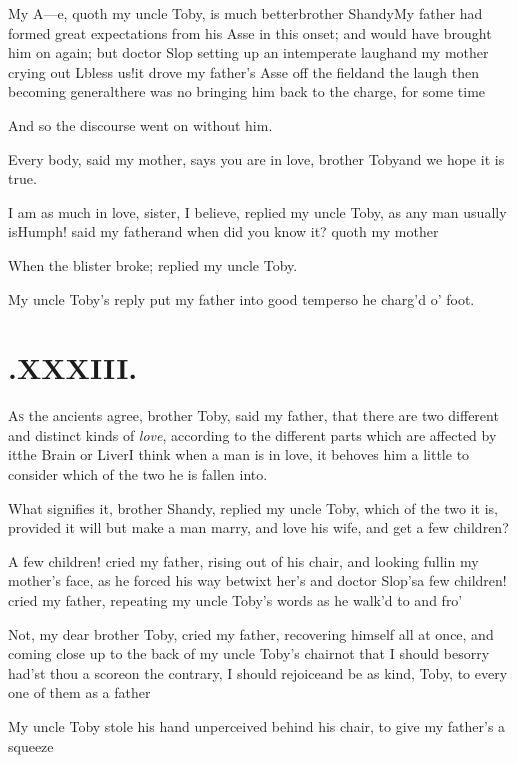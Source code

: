 \documentclass{article}
\begin{document}
My A—e, quoth my uncle Toby, is much
better\tsk brother Shandy\tsk My father had formed great
expectations from his Asse in this onset; and would have brought
him on again; but doctor Slop setting up an intemperate
laugh\tsk and my mother crying out L\tsk bless us!\tsk it
drove my father’s Asse off the field\tsk and the laugh then
becoming general\tsk there was no bringing him back to the
charge, for some time\tsh

\newpage
And so the discourse went on without him.

Every body, said my mother, says\break
you are in love, brother Toby\tsk and we\break
hope it is true.

I am as much in love, sister, I believe, replied my uncle
Toby, as any man usually is\tsk Humph! said my
father\tsk\break and when did you know it? quoth my
mother\tsh

\tsh When the blister broke; replied my uncle
Toby.

My uncle Toby’s reply put my father into good
temper\tsk so he charg’d o’ foot.

\section{.\enspace XXXIII.}

\lettrine{A}{s} the ancients agree, brother Toby, said my father, that there are two
different and distinct kinds of \textit{love}, according to the different parts
which are affected by it\tsk the Brain or Liver\tsh I think when a man is in love, it
behoves him a little to consider which of the two he is fallen into.

What signifies it, brother Shandy, replied my uncle
Toby, which of the two it is, provided it will but make a
man marry, and love his wife, and get a few children?

\tsh A few children! cried my father, rising out of his
chair, and looking full\pb in my mother’s face, as he forced his
way betwixt her’s and doctor Slop’s\tsk a few children! cried my father, repeating my uncle
Toby’s words as he walk’d to and
fro’\tsh

\tsh Not, my dear brother Toby, cried my father, recovering
himself all at once, and coming close up to the back of my uncle
Toby’s chair\tsk not that I should be\break sorry had’st thou a
score\tsk on the contrary, I should rejoice\tsk and be as kind,
Toby, to every one of them as a father\tsk 

My uncle Toby stole his hand unperceived behind his
chair, to give my father’s a squeeze\tsh
\end{document}
